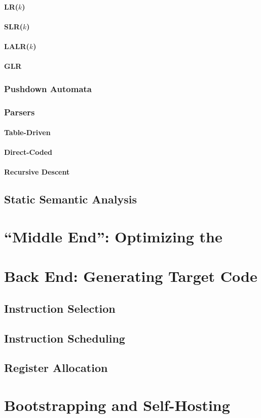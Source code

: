 \paragraph{LR($k$)}
\paragraph{SLR($k$)}
\paragraph{LALR($k$)}
\paragraph{GLR}

\subsubsection{Pushdown Automata}

\subsubsection{Parsers}
\paragraph{Table-Driven}
\paragraph{Direct-Coded}
\paragraph{Recursive Descent}

\subsection{Static Semantic Analysis}

\section{``Middle End'': Optimizing the }

\section{Back End: Generating Target Code}
\subsection{Instruction Selection}

\subsection{Instruction Scheduling}

\subsection{Register Allocation}

\section{Bootstrapping and Self-Hosting}